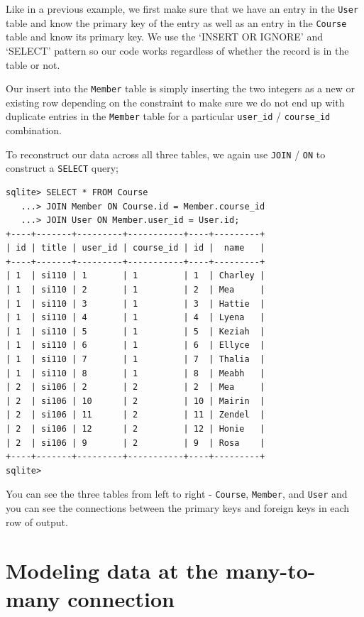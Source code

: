\documentclass[10pt,]{book}
\begin{document}
Like in a previous example, we first make sure that we have an entry in
the \texttt{User} table and know the primary key of the entry as well as
an entry in the \texttt{Course} table and know its primary key. We use
the `INSERT OR IGNORE' and `SELECT' pattern so our code works regardless
of whether the record is in the table or not.

Our insert into the \texttt{Member} table is simply inserting the two
integers as a new or existing row depending on the constraint to make
sure we do not end up with duplicate entries in the \texttt{Member}
table for a particular \texttt{user\_id} / \texttt{course\_id}
combination.

 To reconstruct our data across all three tables, we
again use \texttt{JOIN} / \texttt{ON} to construct a \texttt{SELECT}
query;

{\small
\begin{verbatim}
sqlite> SELECT * FROM Course
   ...> JOIN Member ON Course.id = Member.course_id
   ...> JOIN User ON Member.user_id = User.id;
+----+-------+---------+-----------+----+---------+
| id | title | user_id | course_id | id |  name   |
+----+-------+---------+-----------+----+---------+
| 1  | si110 | 1       | 1         | 1  | Charley |
| 1  | si110 | 2       | 1         | 2  | Mea     |
| 1  | si110 | 3       | 1         | 3  | Hattie  |
| 1  | si110 | 4       | 1         | 4  | Lyena   |
| 1  | si110 | 5       | 1         | 5  | Keziah  |
| 1  | si110 | 6       | 1         | 6  | Ellyce  |
| 1  | si110 | 7       | 1         | 7  | Thalia  |
| 1  | si110 | 8       | 1         | 8  | Meabh   |
| 2  | si106 | 2       | 2         | 2  | Mea     |
| 2  | si106 | 10      | 2         | 10 | Mairin  |
| 2  | si106 | 11      | 2         | 11 | Zendel  |
| 2  | si106 | 12      | 2         | 12 | Honie   |
| 2  | si106 | 9       | 2         | 9  | Rosa    |
+----+-------+---------+-----------+----+---------+
sqlite>
\end{verbatim}
}

You can see the three tables from left to right - \texttt{Course},
\texttt{Member}, and \texttt{User} and you can see the connections
between the primary keys and foreign keys in each row of output.

\section{Modeling data at the many-to-many
connection}\label{modeling-data-at-the-many-to-many-connection}
\end{document}
